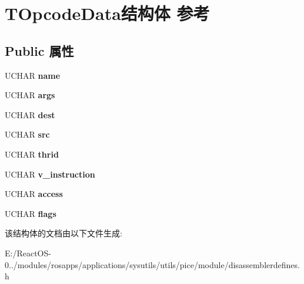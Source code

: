 \hypertarget{struct_t_opcode_data}{}\section{T\+Opcode\+Data结构体 参考}
\label{struct_t_opcode_data}
\subsection*{Public 属性}
\begin{DoxyCompactItemize}
\item 
\mbox{\label{struct_t_opcode_data_a7f7274a03bf0fc387c386d64d797c22b}} 
U\+C\+H\+AR {\bfseries name}
\item 
\mbox{\label{struct_t_opcode_data_a05aa56373525491001553c1bc56377b4}} 
U\+C\+H\+AR {\bfseries args}
\item 
\mbox{\label{struct_t_opcode_data_a8fb38bd99a594fa41fbfc04b5fd6b749}} 
U\+C\+H\+AR {\bfseries dest}
\item 
\mbox{\label{struct_t_opcode_data_a9055c0af1d799d8547baaa480337f98d}} 
U\+C\+H\+AR {\bfseries src}
\item 
\mbox{\label{struct_t_opcode_data_a1d44964b032a813173c3175bc263d764}} 
U\+C\+H\+AR {\bfseries thrid}
\item 
\mbox{\label{struct_t_opcode_data_a771e5b249a020ce34d5234749f2115f8}} 
U\+C\+H\+AR {\bfseries v\+\_\+instruction}
\item 
\mbox{\label{struct_t_opcode_data_a87e8dc4fad29d79d4beb76eea69baa0a}} 
U\+C\+H\+AR {\bfseries access}
\item 
\mbox{\label{struct_t_opcode_data_a2e3f6ac551c8e31b4d3b0debe440edc4}} 
U\+C\+H\+AR {\bfseries flags}
\end{DoxyCompactItemize}


该结构体的文档由以下文件生成\+:\begin{DoxyCompactItemize}
\item 
E\+:/\+React\+O\+S-\/0../modules/rosapps/applications/sysutils/utils/pice/module/disassemblerdefines.\+h\end{DoxyCompactItemize}
